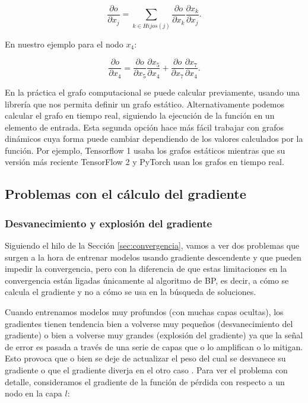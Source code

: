 $$ \frac{\partial o }{ \partial x_j } = \sum_{k \in Hijos(j)} \frac{\partial o}{ \partial x_k} \frac{\partial x_k}{\partial x_j}.$$

En nuestro ejemplo para el nodo $x_4$:

$$   \frac{\partial o }{ \partial x_4 }  =  \frac{\partial o}{ \partial x_5} \frac{\partial x_5}{\partial x_4} +\frac{\partial o}{ \partial x_7} \frac{\partial x_7}{\partial x_4} .$$


En la práctica el grafo computacional se puede calcular previamente, usando una librería que nos permita definir un grafo estático. Alternativamente podemos calcular el grafo en tiempo real, siguiendo la ejecución de la función en un elemento de entrada. Esta segunda opción hace más fácil trabajar con grafos dinámicos cuya forma puede cambiar dependiendo de los valores calculados por la función. Por ejemplo, Tensorflow 1 usaba los grafos estáticos mientras que su versión más reciente TensorFlow 2 y PyTorch usan los grafos en tiempo real. 




\subsection{Problemas con el cálculo del gradiente}

\subsubsection{Desvanecimiento y explosión del gradiente}\label{sec:desvyexpl}


Siguiendo el hilo de la Sección \ref{sec:convergencia}, vamos a ver dos problemas que surgen a la hora de entrenar modelos usando gradiente descendente y que pueden impedir la convergencia, pero con la diferencia de que estas limitaciones en la convergencia están ligadas únicamente al algoritmo de BP, es decir, a cómo se calcula el gradiente y no a cómo se usa en la búsqueda de soluciones.

Cuando entrenamos modelos muy profundos (con muchas capas ocultas), los gradientes tienen tendencia bien a volverse muy pequeños (desvanecimiento del gradiente) o bien a volverse muy grandes (explosión del gradiente) ya que la señal de error es pasada a través de una serie de capas que o lo amplifican o lo mitigan. Esto provoca que o bien se deje de actualizar el peso del cual se desvanece su gradiente o que el gradiente diverja en el otro caso \cite{VanishExplode}. Para ver el problema con detalle, consideramos el gradiente de la función de pérdida con respecto a un nodo en la capa $l$:

